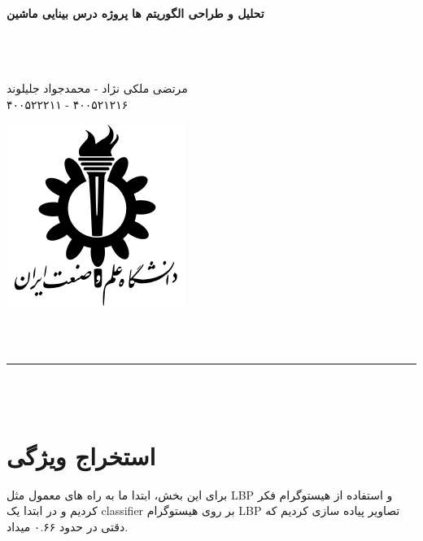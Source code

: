 \documentclass{article}
\begin{document}
	\noindent
	\textbf{تحلیل و طراحی الگوریتم ها} 
	\textbf{
	پروژه درس بینایی ماشین
	}
	\\ \\ 
	
	
	\begin{minipage}{0.9\textwidth}
		~\\ ~\\
		 مرتضی ملکی نژاد - محمدجواد جلیلوند \\
		 ۴۰۰۵۲۲۲۱۱ - ۴۰۰۵۲۱۲۱۶
	\end{minipage}
	\noindent\begin{minipage}{0.1\textwidth}%
		\begin{flushleft}
			
			\includegraphics[width=\linewidth]{logo.png}
		\end{flushleft}
	\end{minipage}%
	\\ \\
	\hrule ~\\ ~\\
	
	\section{استخراج ویژگی}
	برای این بخش، ابتدا ما به راه های معمول مثل LBP و استفاده از هیستوگرام فکر کردیم و در ابتدا یک classifier بر روی هیستوگرام LBP تصاویر پیاده سازی کردیم که دقتی در حدود ۰.۶۶ میداد.
	
\end{document}
